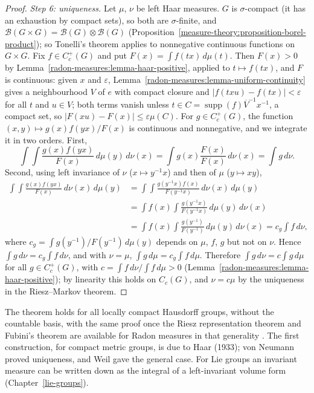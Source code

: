 \begin{proof}
\emph{Step 6: uniqueness.} Let $\mu$, $\nu$ be left Haar measures. $G$ is $\sigma$-compact (it has an exhaustion by compact sets), so both are $\sigma$-finite, and
$\mathcal{B}(G \times G) = \mathcal{B}(G) \otimes \mathcal{B}(G)$ (Proposition~\ref{measure-theory:proposition-borel-product}); so Tonelli's theorem applies to nonnegative continuous functions on $G \times G$. Fix
$f \in C_c^+(G)$ and put $F(x) = \int f(tx)\,d\mu(t)$. Then $F(x) > 0$ by Lemma~\ref{radon-measures:lemma-haar-positive}, applied to $t \mapsto f(tx)$, and $F$ is continuous: given $x$ and $\varepsilon$,
Lemma~\ref{radon-measures:lemma-uniform-continuity} gives a neighbourhood $V$ of $e$ with compact closure and $|f(txu) - f(tx)| < \varepsilon$ for all $t$ and $u \in V$; both terms vanish unless
$t \in C = \operatorname{supp}(f)\overline{V}^{-1}x^{-1}$, a compact set, so $|F(xu) - F(x)| \leq \varepsilon\mu(C)$. For $g \in C_c^+(G)$, the function $(x, y) \mapsto g(x)f(yx)/F(x)$ is continuous and
nonnegative, and we integrate it in two orders. First,
\[
\int\!\!\int\frac{g(x)f(yx)}{F(x)}\,d\mu(y)\,d\nu(x) = \int g(x)\frac{F(x)}{F(x)}\,d\nu(x) = \int g\,d\nu.
\]
Second, using left invariance of $\nu$ ($x \mapsto y^{-1}x$) and then of $\mu$ ($y \mapsto xy$),
\[\begin{aligned}
\int\!\!\int\frac{g(x)f(yx)}{F(x)}\,d\nu(x)\,d\mu(y) &= \int\!\!\int\frac{g(y^{-1}x)f(x)}{F(y^{-1}x)}\,d\nu(x)\,d\mu(y) \\
&= \int f(x)\int\frac{g(y^{-1}x)}{F(y^{-1}x)}\,d\mu(y)\,d\nu(x) \\
&= \int f(x)\int\frac{g(y^{-1})}{F(y^{-1})}\,d\mu(y)\,d\nu(x) = c_g\int f\,d\nu,
\end{aligned}\]
where $c_g = \int g(y^{-1})/F(y^{-1})\,d\mu(y)$ depends on $\mu$, $f$, $g$ but not on $\nu$. Hence $\int g\,d\nu = c_g\int f\,d\nu$, and with $\nu = \mu$, $\int g\,d\mu = c_g\int f\,d\mu$. Therefore
$\int g\,d\nu = c\int g\,d\mu$ for all $g \in C_c^+(G)$, with $c = \int f\,d\nu/\int f\,d\mu > 0$ (Lemma~\ref{radon-measures:lemma-haar-positive}); by linearity this holds on $C_c(G)$, and $\nu = c\mu$ by
the uniqueness in the Riesz--Markov theorem.
\end{proof}

\begin{remark}\label{radon-measures:remark-haar}
The theorem holds for all locally compact Hausdorff groups, without the countable basis, with the same proof once the Riesz representation theorem and Fubini's theorem are available for Radon
measures in that generality \cite[Section 11.1]{folland-real}. The first construction, for compact metric groups, is due to Haar (1933); von Neumann proved uniqueness, and Weil gave the general
case. For Lie groups an invariant measure can be written down as the integral of a left-invariant volume form (Chapter~\ref{lie-groups}).
\end{remark}

